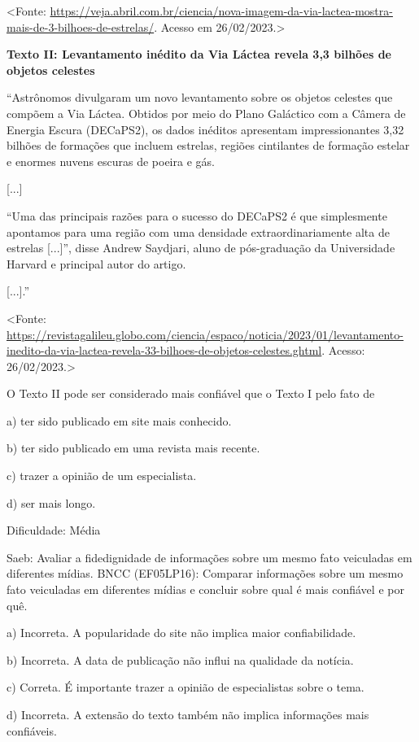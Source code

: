\textless{}Fonte:
\url{https://veja.abril.com.br/ciencia/nova-imagem-da-via-lactea-mostra-mais-de-3-bilhoes-de-estrelas/}.
Acesso em 26/02/2023.\textgreater{}

\textbf{Texto II: Levantamento inédito da Via Láctea revela 3,3 bilhões
de objetos celestes}

``Astrônomos divulgaram um novo levantamento sobre os objetos celestes
que compõem a Via Láctea. Obtidos por meio do Plano Galáctico com a
Câmera de Energia Escura (DECaPS2), os dados inéditos apresentam
impressionantes 3,32 bilhões de formações que incluem estrelas, regiões
cintilantes de formação estelar e enormes nuvens escuras de poeira e
gás.

{[}...{]}

``Uma das principais razões para o sucesso do DECaPS2 é que simplesmente
apontamos para uma região com uma densidade extraordinariamente alta de
estrelas {[}...{]}'', disse Andrew Saydjari, aluno de pós-graduação da
Universidade Harvard e principal autor do artigo.

{[}...{]}.''

\textless{}Fonte:
\url{https://revistagalileu.globo.com/ciencia/espaco/noticia/2023/01/levantamento-inedito-da-via-lactea-revela-33-bilhoes-de-objetos-celestes.ghtml}.
Acesso: 26/02/2023.\textgreater{}

O Texto II pode ser considerado mais confiável que o Texto I pelo fato
de

a) ter sido publicado em site mais conhecido.

b) ter sido publicado em uma revista mais recente.

c) trazer a opinião de um especialista.

d) ser mais longo.

Dificuldade: Média

Saeb: Avaliar a fidedignidade de informações sobre um mesmo fato
veiculadas em diferentes mídias. BNCC (EF05LP16): Comparar informações
sobre um mesmo fato veiculadas em diferentes mídias e concluir sobre
qual é mais confiável e por quê.

a) Incorreta. A popularidade do site não implica maior confiabilidade.

b) Incorreta. A data de publicação não influi na qualidade da notícia.

c) Correta. É importante trazer a opinião de especialistas sobre o tema.

d) Incorreta. A extensão do texto também não implica informações mais
confiáveis.


